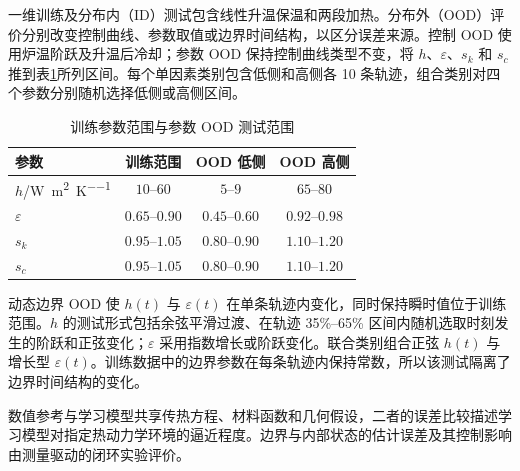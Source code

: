 一维训练及分布内（ID）测试包含线性升温保温和两段加热。分布外（OOD）评价分别改变控制曲线、参数取值或边界时间结构，以区分误差来源。控制 OOD 使用炉温阶跃及升温后冷却；参数 OOD 保持控制曲线类型不变，将 $h$、$\varepsilon$、$s_k$ 和 $s_c$ 推到表\ref{tab:ood_ranges}所列区间。每个单因素类别包含低侧和高侧各 10 条轨迹，组合类别对四个参数分别随机选择低侧或高侧区间。

\begin{table}[H]
  \centering
  \caption{训练参数范围与参数 OOD 测试范围}
  \label{tab:ood_ranges}
  \begin{tabular}{lccc}
    \toprule
    参数 & 训练范围 & OOD 低侧 & OOD 高侧 \\
    \midrule
    $h$/\si{\watt\per\square\metre\per\kelvin} & $10$--$60$ & $5$--$9$ & $65$--$80$ \\
    $\varepsilon$ & $0.65$--$0.90$ & $0.45$--$0.60$ & $0.92$--$0.98$ \\
    $s_k$ & $0.95$--$1.05$ & $0.80$--$0.90$ & $1.10$--$1.20$ \\
    $s_c$ & $0.95$--$1.05$ & $0.80$--$0.90$ & $1.10$--$1.20$ \\
    \bottomrule
  \end{tabular}
\end{table}

动态边界 OOD 使 $h(t)$ 与 $\varepsilon(t)$ 在单条轨迹内变化，同时保持瞬时值位于训练范围。$h$ 的测试形式包括余弦平滑过渡、在轨迹 35\%--65\% 区间内随机选取时刻发生的阶跃和正弦变化；$\varepsilon$ 采用指数增长或阶跃变化。联合类别组合正弦 $h(t)$ 与增长型 $\varepsilon(t)$。训练数据中的边界参数在每条轨迹内保持常数，所以该测试隔离了边界时间结构的变化。

数值参考与学习模型共享传热方程、材料函数和几何假设，二者的误差比较描述学习模型对指定热动力学环境的逼近程度。边界与内部状态的估计误差及其控制影响由测量驱动的闭环实验评价。
